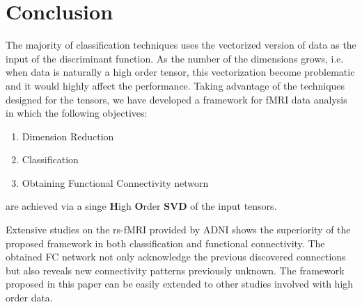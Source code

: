 \documentclass[journal]{IEEEtran}
\begin{document}
	
	
	
	
	
	
	
	
	
	\section{Conclusion}
	The majority of classification techniques uses the vectorized version of data as the input of the discriminant function. As the number of the dimensions grows, i.e. when data is naturally a high order tensor, this vectorization become problematic and it would highly affect the  performance. Taking advantage of the techniques designed for the tensors, we have developed a framework for fMRI data analysis in which the following objectives: 
	\begin{enumerate}
		\item 
		Dimension Reduction
		\item 
		Classification 
		\item 
		Obtaining Functional Connectivity networn 
	\end{enumerate}
	are achieved via a singe \textbf{H}igh \textbf{O}rder \textbf{SVD} of the input tensors. 
	
	Extensive studies on the rs-fMRI provided by ADNI shows the superiority of the proposed framework in both classification and functional connectivity. The obtained FC network not only acknowledge the previous discovered connections but also reveals new connectivity patterns previously unknown.
	The framework proposed in this paper can be easily extended to other studies involved with high order data.  
	
\end{document}
